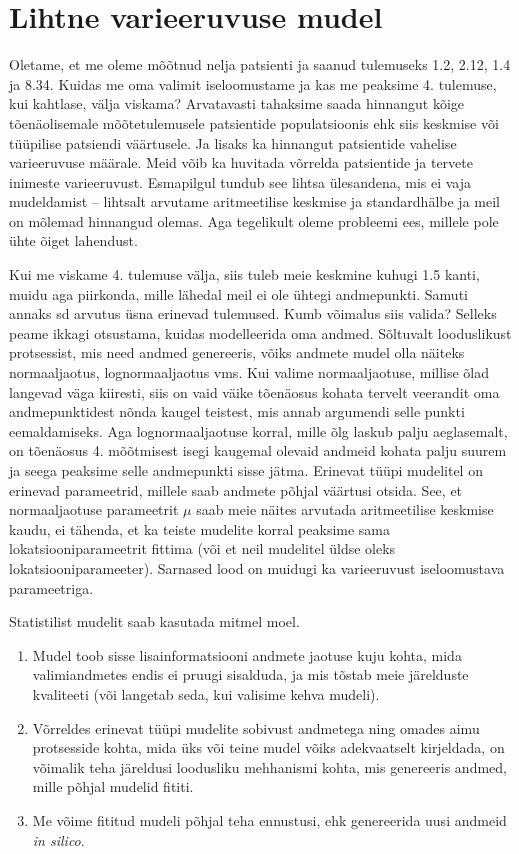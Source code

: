 \documentclass[]{book}
\begin{document}
\hypertarget{lihtne-varieeruvuse-mudel}{%
\section{Lihtne varieeruvuse mudel}\label{lihtne-varieeruvuse-mudel}}

Oletame, et me oleme mõõtnud nelja patsienti ja saanud tulemuseks 1.2, 2.12, 1.4 ja 8.34. Kuidas me oma valimit iseloomustame ja kas me peaksime 4. tulemuse, kui kahtlase, välja viskama?
Arvatavasti tahaksime saada hinnangut kõige tõenäolisemale mõõtetulemusele patsientide populatsioonis ehk siis keskmise või tüüpilise patsiendi väärtusele. Ja lisaks ka hinnangut patsientide vahelise varieeruvuse määrale. Meid võib ka huvitada võrrelda patsientide ja tervete inimeste varieeruvust. Esmapilgul tundub see lihtsa ülesandena, mis ei vaja mudeldamist -- lihtsalt arvutame aritmeetilise keskmise ja standardhälbe ja meil on mõlemad hinnangud olemas. Aga tegelikult oleme probleemi ees, millele pole ühte õiget lahendust.

Kui me viskame 4. tulemuse välja, siis tuleb meie keskmine kuhugi 1.5 kanti, muidu aga piirkonda, mille lähedal meil ei ole ühtegi andmepunkti. Samuti annaks sd arvutus üsna erinevad tulemused. Kumb võimalus siis valida? Selleks peame ikkagi otsustama, kuidas modelleerida oma andmed. Sõltuvalt looduslikust protsessist, mis need andmed genereeris, võiks andmete mudel olla näiteks normaaljaotus, lognormaaljaotus vms. Kui valime normaaljaotuse, millise õlad langevad väga kiiresti, siis on vaid väike tõenäosus kohata tervelt veerandit oma andmepunktidest nõnda kaugel teistest, mis annab argumendi selle punkti eemaldamiseks. Aga lognormaaljaotuse korral, mille õlg laskub palju aeglasemalt, on tõenäosus 4. mõõtmisest isegi kaugemal olevaid andmeid kohata palju suurem ja seega peaksime selle andmepunkti sisse jätma.
Erinevat tüüpi mudelitel on erinevad parameetrid, millele saab andmete põhjal väärtusi otsida. See, et normaaljaotuse parameetrit \(\mu\) saab meie näites arvutada aritmeetilise keskmise kaudu, ei tähenda, et ka teiste mudelite korral peaksime sama lokatsiooniparameetrit fittima (või et neil mudelitel üldse oleks lokatsiooniparameeter). Sarnased lood on muidugi ka varieeruvust iseloomustava parameetriga.

Statistilist mudelit saab kasutada mitmel moel.

\begin{enumerate}
\def\labelenumi{\arabic{enumi}.}
\item
  Mudel toob sisse lisainformatsiooni andmete jaotuse kuju kohta, mida valimiandmetes endis ei pruugi sisalduda, ja mis tõstab meie järelduste kvaliteeti (või langetab seda, kui valisime kehva mudeli).
\item
  Võrreldes erinevat tüüpi mudelite sobivust andmetega ning omades aimu protsesside kohta, mida üks või teine mudel võiks adekvaatselt kirjeldada, on võimalik teha järeldusi loodusliku mehhanismi kohta, mis genereeris andmed, mille põhjal mudelid fititi.
\item
  Me võime fititud mudeli põhjal teha ennustusi, ehk genereerida uusi andmeid \emph{in silico}.
\end{enumerate}
\end{document}
